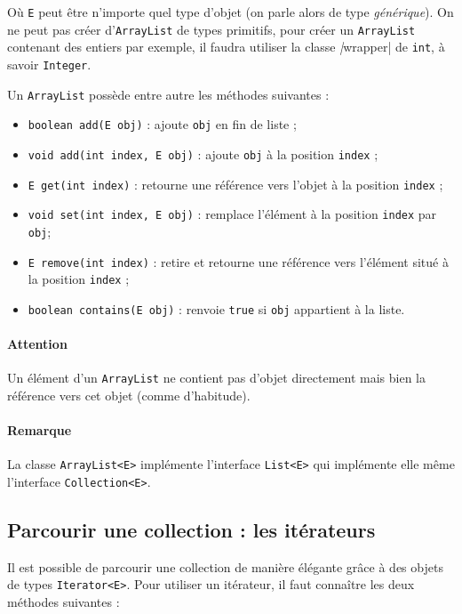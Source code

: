 Où \lstinline|E| peut être n'importe quel type d'objet (on parle alors de type \textit{générique}). 
On ne peut pas créer d'\lstinline|ArrayList| de types primitifs, pour créer un
\lstinline|ArrayList| contenant des entiers par exemple, il faudra utiliser la classe
\textit|wrapper| de \lstinline|int|, à savoir \lstinline|Integer|.

Un \lstinline|ArrayList| possède entre autre les méthodes suivantes :

\begin{itemize}
\item \lstinline|boolean add(E obj)| : ajoute \lstinline|obj| en fin de liste ;
\item \lstinline|void add(int index, E obj)| : ajoute \lstinline|obj| à la position \lstinline|index| ;
\item \lstinline|E get(int index)| : retourne une référence vers l'objet à la position \lstinline|index| ;
\item \lstinline|void set(int index, E obj)| : remplace l'élément à la position \lstinline|index|
par \lstinline|obj|;
\item \lstinline|E remove(int index)| : retire et retourne une référence vers l'élément situé
à la position \lstinline|index| ;
\item \lstinline|boolean contains(E obj)| : renvoie \lstinline|true| si \lstinline|obj| appartient
à la liste.
\end{itemize}

\paragraph{Attention}
Un élément d'un \lstinline|ArrayList| ne contient pas d'objet directement mais bien
la référence vers cet objet (comme d'habitude).

\paragraph{Remarque}
La classe \lstinline|ArrayList<E>| implémente l'interface \lstinline|List<E>| qui implémente
elle même l'interface \lstinline|Collection<E>|.

\subsection{Parcourir une collection : les itérateurs}
Il est possible de parcourir une collection de manière élégante grâce à des objets
de types \lstinline|Iterator<E>|. Pour utiliser un itérateur, il faut connaître
les deux méthodes suivantes :

